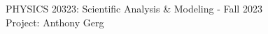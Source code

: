 \documentclass[12pt]{article}
\begin{document}
\def\pos{\medskip\quad}
\def\subpos{\smallskip \qquad}

\begin{center}
{\large
PHYSICS  20323: Scientific Analysis \& Modeling - Fall 2023
}\\
{\large Project: Anthony Gerg}\\\vskip0.25in
\end{center}
\end{document}
